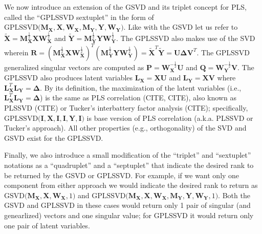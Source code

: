 \documentclass[12pt]{article}
\begin{document}
We now introduce an extension of the GSVD and its triplet concept for
PLS, called the ``GPLSSVD sextuplet'' in the form of
\(\mathrm{GPLSSVD(} {\mathbf M}_{\mathbf X}, {\mathbf X}, {\mathbf W}_{\mathbf X}, {\mathbf M}_{\mathbf Y}, {\mathbf Y}, {\mathbf W}_{\mathbf Y} \mathrm{)}\).
Like with the GSVD let us refer to
\(\widetilde{\mathbf X} = {\mathbf M}_{\mathbf X}^{\frac{1}{2}}{\mathbf X}{\mathbf W}_{\mathbf X}^{\frac{1}{2}}\)
and
\(\widetilde{\mathbf Y} = {\mathbf M}_{\mathbf Y}^{\frac{1}{2}}{\mathbf Y}{\mathbf W}_{\mathbf Y}^{\frac{1}{2}}\).
The GPLSSVD also makes use of the SVD wherein
\({\mathbf R} = ({\mathbf M}_{\mathbf X}^{\frac{1}{2}}{\mathbf X}{\mathbf W}_{\mathbf X}^{\frac{1}{2}})^{T}({\mathbf M}_{\mathbf Y}^{\frac{1}{2}}{\mathbf Y}{\mathbf W}_{\mathbf Y}^{\frac{1}{2}}) = \widetilde{\mathbf{X}}^{T}\widetilde{\mathbf{Y}} = {\mathbf U} {\boldsymbol \Delta} {\mathbf V}^{T}\).
The GPLSSVD generalized singular vectors are computed as
\({\mathbf P} = {\mathbf W}_{{\mathbf X}}^{-\frac{1}{2}}{\mathbf U}\)
and
\({\mathbf Q} = {\mathbf W}_{{\mathbf Y}}^{-\frac{1}{2}}{\mathbf V}\).
The GPLSSVD also produces latent variables
\({\mathbf L}_{\mathbf X} = {\mathbf X}{\mathbf U}\) and
\({\mathbf L}_{\mathbf Y} = {\mathbf X}{\mathbf V}\) where
\({\mathbf L}_{\mathbf X}^{T} {\mathbf L}_{\mathbf Y} = {\boldsymbol \Delta}\).
By its definition, the maximization of the latent variables (i.e.,
\({\mathbf L}_{\mathbf X}^{T} {\mathbf L}_{\mathbf Y} = {\boldsymbol \Delta}\))
is the same as PLS correlation (CITE, CITE), also known as PLSSVD (CITE)
or Tucker's interbattery factor analysis (CITE); specifically,
\(\mathrm{GPLSSVD(} {\mathbf I}, {\mathbf X}, {\mathbf I}, {\mathbf I}, {\mathbf Y}, {\mathbf I} \mathrm{)}\)
is base version of PLS correlation (a.k.a. PLSSVD or Tucker's approach).
All other properties (e.g., orthogonality) of the SVD and GSVD exist for
the GPLSSVD.

Finally, we also introduce a small modification of the ``triplet'' and
``sextuplet'' notations as a ``quadruplet'' and a ``septuplet'' that
indicate the desired rank to be returned by the GSVD or GPLSSVD. For
example, if we want only one component from either approach we would
indicate the desired rank to return as
\(\mathrm{GSVD(} {\mathbf M}_{{\mathbf X}}, {\mathbf X}, {\mathbf W}_{{\mathbf X}}, 1 \mathrm{)}\)
and
\(\mathrm{GPLSSVD(} {\mathbf M}_{\mathbf X}, {\mathbf X}, {\mathbf W}_{\mathbf X}, {\mathbf M}_{\mathbf Y}, {\mathbf Y}, {\mathbf W}_{\mathbf Y}, 1 \mathrm{)}\).
Both the GSVD and GPLSSVD in these cases would return only 1 pair of
singular (and genearlized) vectors and one singular value; for GPLSSVD
it would return only one pair of latent variables.
\end{document}
